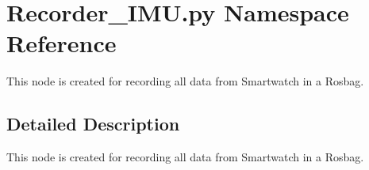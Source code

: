 \hypertarget{namespaceRecorder__IMU_1_1py}{}\section{Recorder\+\_\+\+I\+M\+U.\+py Namespace Reference}
\label{namespaceRecorder__IMU_1_1py}


This node is created for recording all data from Smartwatch in a Rosbag.  




\subsection{Detailed Description}
This node is created for recording all data from Smartwatch in a Rosbag. 

